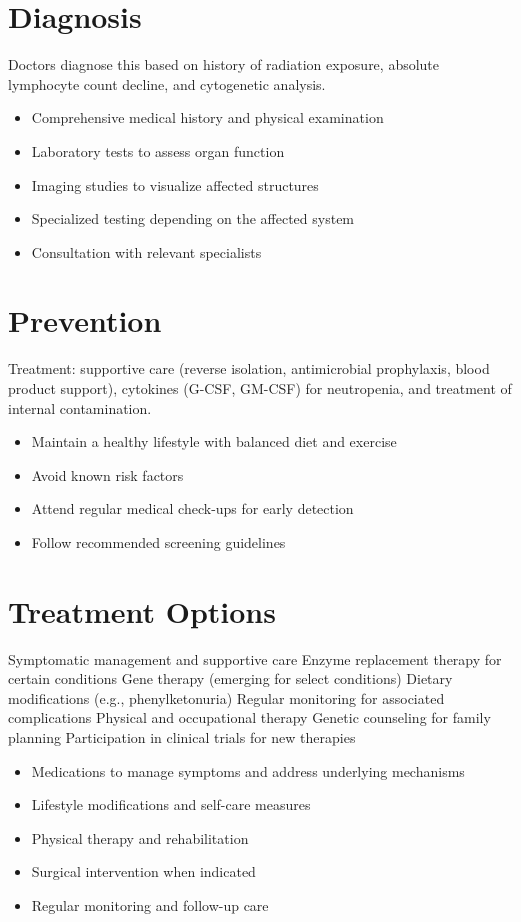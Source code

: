 \section{Diagnosis}
Doctors diagnose this based on history of radiation exposure, absolute lymphocyte count decline, and cytogenetic analysis.

\begin{itemize}[noitemsep]
  \item Comprehensive medical history and physical examination
  \item Laboratory tests to assess organ function
  \item Imaging studies to visualize affected structures
  \item Specialized testing depending on the affected system
  \item Consultation with relevant specialists
\end{itemize}
\section{Prevention}
Treatment: supportive care (reverse isolation, antimicrobial prophylaxis, blood product support), cytokines (G-CSF, GM-CSF) for neutropenia, and treatment of internal contamination.

\begin{itemize}[noitemsep]
  \item Maintain a healthy lifestyle with balanced diet and exercise
  \item Avoid known risk factors
  \item Attend regular medical check-ups for early detection
  \item Follow recommended screening guidelines
\end{itemize}
\section{Treatment Options}
Symptomatic management and supportive care Enzyme replacement therapy for certain conditions Gene therapy (emerging for select conditions) Dietary modifications (e.g., phenylketonuria) Regular monitoring for associated complications Physical and occupational therapy Genetic counseling for family planning Participation in clinical trials for new therapies

\begin{itemize}[noitemsep]
  \item Medications to manage symptoms and address underlying mechanisms
  \item Lifestyle modifications and self-care measures
  \item Physical therapy and rehabilitation
  \item Surgical intervention when indicated
  \item Regular monitoring and follow-up care
\end{itemize}
